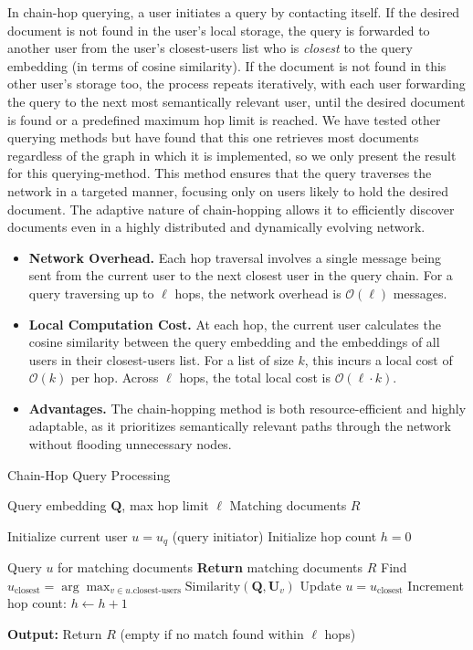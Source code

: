 \documentclass[10pt,journal]{IEEEtran}
\begin{document}
In chain-hop querying, a user initiates a query by contacting itself. If the desired document is not found in the user's local storage, the query is forwarded to another user from the user's closest-users list who is \emph{closest} to the query embedding (in terms of cosine similarity). If the document is not found in this other user's storage too, the process repeats iteratively, with each user forwarding the query to the next most semantically relevant user, until the desired document is found or a predefined maximum hop limit is reached. We have tested other querying methods but have found that this one retrieves most documents regardless of the graph in which it is implemented, so we only present the result for this querying-method.
This method ensures that the query traverses the network in a targeted manner, focusing only on users likely to hold the desired document. The adaptive nature of chain-hopping allows it to efficiently discover documents even in a highly distributed and dynamically evolving network.

\begin{itemize}
    \item \textbf{Network Overhead.} Each hop traversal involves a single message being sent from the current user to the next closest user in the query chain. For a query traversing up to $\ell$ hops, the network overhead is $\mathcal{O}(\ell)$ messages.
    \item \textbf{Local Computation Cost.} At each hop, the current user calculates the cosine similarity between the query embedding and the embeddings of all users in their closest-users list. For a list of size $k$, this incurs a local cost of $\mathcal{O}(k)$ per hop. Across $\ell$ hops, the total local cost is $\mathcal{O}(\ell \cdot k)$.
    \item \textbf{Advantages.} The chain-hopping method is both resource-efficient and highly adaptable, as it prioritizes semantically relevant paths through the network without flooding unnecessary nodes.
\end{itemize}

\begin{algorithm}[]
\caption{Chain-Hop Query Processing}
\label{alg:chain_hop_query}
\begin{algorithmic}[1]
\REQUIRE Query embedding $\mathbf{Q}$, max hop limit $\ell$
\ENSURE Matching documents $R$

\STATE Initialize current user $u = u_q$ (query initiator)
\STATE Initialize hop count $h = 0$

    \STATE Query $u$ for matching documents
        \STATE \textbf{Return} matching documents $R$
    \ENDIF
    \STATE Find $u_{\text{closest}} = \arg\max_{v \in u.\text{closest-users}} \text{Similarity}(\mathbf{Q}, \mathbf{U}_v)$
    \STATE Update $u = u_{\text{closest}}$
    \STATE Increment hop count: $h \gets h + 1$
\ENDWHILE

\STATE \textbf{Output:} Return $R$ (empty if no match found within $\ell$ hops)

\end{algorithmic}
\end{algorithm}
\end{document}
